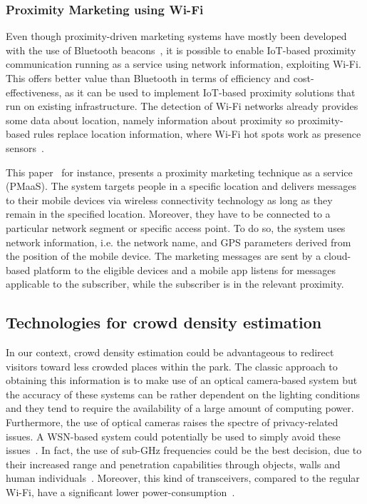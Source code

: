 \subsubsection{Proximity Marketing using Wi-Fi}\label{sec:proximity-marketing-wifi}
Even though proximity-driven marketing systems have mostly been developed with the use of Bluetooth beacons~\cite{mndebele2017iot}, it is possible to
enable IoT-based proximity communication running as a service using network information, exploiting Wi-Fi. This offers better value than Bluetooth in
terms of efficiency and cost-effectiveness, as it can be used to implement IoT-based proximity solutions that run on existing infrastructure.
The detection of Wi-Fi networks already provides some data about location, namely information about proximity so proximity-based rules replace location
information, where Wi-Fi hot spots work as presence sensors~\cite{dmitry2013network}.

This paper~\cite{mndebele2017iot} for instance, presents a proximity marketing technique as a service (PMaaS). The system targets people in a specific location
and delivers messages to their mobile devices via wireless connectivity technology as long as they remain in the specified location. Moreover, they
have to be connected to a particular network segment or specific access point. To do so, the system uses network information, i.e. the network name,
and GPS parameters derived from the position of the mobile device. The marketing messages are sent by a cloud-based platform to the eligible devices and a mobile app listens for messages applicable to the subscriber, while the subscriber is in the relevant proximity.

\subsection{Technologies for crowd density estimation}\label{subsec:sub-ghz-wireless-sensor-network-for-crowd-density-estimation}
In our context, crowd density estimation could be advantageous to redirect visitors toward less crowded places within the park. The classic approach
to obtaining this information is to make use of an optical camera-based system but the accuracy of these systems can be rather dependent on the
lighting conditions and they tend to require the availability of a large amount of computing power. Furthermore, the use of optical cameras raises
the spectre of privacy-related issues. A WSN-based system could potentially be used to simply avoid these issues~\cite{denis2018large}. In fact, the
use of sub-GHz frequencies could be the best decision, due to their increased range and penetration capabilities through objects, walls and human
individuals~\cite{denis2018large}. Moreover, this kind of transceivers, compared to the regular Wi-Fi, have a significant lower
power-consumption~\cite{fudickar2014comparing}.

